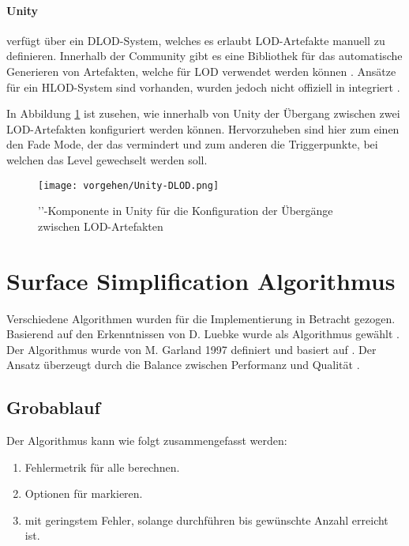 \paragraph{Unity}

 verfügt über ein DLOD-System, welches es erlaubt LOD-Artefakte manuell zu definieren.
Innerhalb der  Community gibt es eine Bibliothek für das automatische Generieren von Artefakten, welche für LOD verwendet werden können \cite{unityMeshSimplification}.
Ansätze für ein HLOD-System sind vorhanden, wurden jedoch nicht offiziell in  integriert \cite{unityAutoLod}.

In Abbildung \ref{fig:unityDLODGroup} ist zusehen, wie innerhalb von Unity der Übergang zwischen zwei LOD-Artefakten konfiguriert werden können. Hervorzuheben sind hier zum einen den Fade Mode, der das  vermindert und zum anderen die Triggerpunkte, bei welchen das Level gewechselt werden soll.

\begin{figure}[H]
  \centering
  \texttt{[image: vorgehen/Unity-DLOD.png]}
  \caption{''-Komponente in Unity für die Konfiguration der Übergänge zwischen LOD-Artefakten}
  \label{fig:unityDLODGroup}
\end{figure}

\section{Surface Simplification Algorithmus}
\label{chap:surfaceSimplificationAlgorithm}
Verschiedene Algorithmen wurden für die Implementierung in Betracht gezogen. Basierend auf den Erkenntnissen von D. Luebke wurde als Algorithmus  gewählt \cite{luebkeAlgorithmComparison}. Der Algorithmus wurde von M. Garland 1997 definiert und basiert auf . Der Ansatz überzeugt durch die Balance zwischen Performanz und Qualität \cite{surfaceSimplificationUsingQuadricErrorMetrices, surfaceSimplificationWithColorUsingQuadricErrorMetrices}.

\subsection{Grobablauf}
Der Algorithmus kann wie folgt zusammengefasst werden:

\begin{enumerate}
  \item Fehlermetrik für alle  berechnen.
  \item Optionen für  markieren.
  \item {} mit geringstem Fehler, solange durchführen bis gewünschte Anzahl  erreicht ist.
\end{enumerate}

